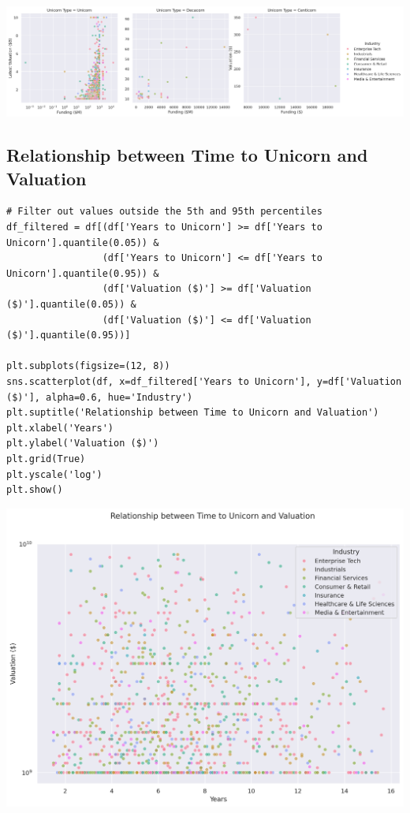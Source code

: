 \documentclass[a4paper,12pt]{article}
\begin{document}
\begin{center}
\includegraphics[width=.9\linewidth]{./.ob-jupyter/192589265a76e100ac55302b2ccbbe97c9b59c3c.png}
\label{}
\end{center}
\subsection{Relationship between Time to Unicorn and Valuation}
\label{sec:org21737df}

\begin{verbatim}
# Filter out values outside the 5th and 95th percentiles
df_filtered = df[(df['Years to Unicorn'] >= df['Years to Unicorn'].quantile(0.05)) &
                 (df['Years to Unicorn'] <= df['Years to Unicorn'].quantile(0.95)) &
                 (df['Valuation ($)'] >= df['Valuation ($)'].quantile(0.05)) &
                 (df['Valuation ($)'] <= df['Valuation ($)'].quantile(0.95))]

plt.subplots(figsize=(12, 8))
sns.scatterplot(df, x=df_filtered['Years to Unicorn'], y=df['Valuation ($)'], alpha=0.6, hue='Industry')
plt.suptitle('Relationship between Time to Unicorn and Valuation')
plt.xlabel('Years')
plt.ylabel('Valuation ($)')
plt.grid(True)
plt.yscale('log')
plt.show()
\end{verbatim}

\begin{center}
\includegraphics[width=.9\linewidth]{./.ob-jupyter/ab345d53297c74faf9b4e92ff3afa494318d36dc.png}
\label{}
\end{center}
\end{document}
